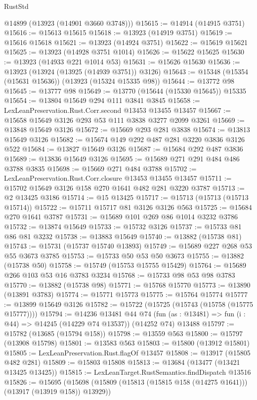 \begin{lexlean}{RustStd}
\begin{coremodule}
{\begin{coremodule}
{{{{{{{{{{{{{{{{{{{{{{{{{{{{{{{{{{{{{      @14899
      (@13923 (@14901 @3660 @3748)))
@15615 := @14914 (@14915 @3751)
@15616 := @15613 @15615
@15618 := @13923 (@14919 @3751)
@15619 := @15616 @15618
@15621 := @13923 (@14924 @3751)
@15622 := @15619 @15621
@15625 := @13923 (@14928 @3751 @1014)
@15626 := @15622 @15625
@15630 := @13923 (@14933 @221 @1014 @53)
@15631 := @15626 @15630
@15636 := @13923 (@13924 (@13925 (@14939 @3751)) @3126)
@15643 := @15348 (@15354 (@15631 @15636)) (@13923 (@15324 @15335 @98))
@15644 := @13772 @98
@15645 := @13777 @98
@15649 := @13770 (@15644 (@15330 @15645)) @15335
@15654 := @13804 @15649 @294 @111 @3841 @3845
@15658 := LexLeanPreservation.Rust.Corr.second @13453 @13455 @13457
@15667 := @15658 @15649 @3126 @293 @53 @111 @3838 @3277 @2099 @3261
@15669 := @13848 @15649 @3126
@15672 := @15669 @293 @281 @3838
@15674 := @13813 @15649 @3126
@15682 := @15674 @149 @292 @487 @281 @3220 @3836 @3126 @522
@15684 := @13827 @15649 @3126
@15687 := @15684 @292 @487 @3836
@15689 := @13836 @15649 @3126
@15695 := @15689 @271 @291 @484 @486 @3788 @3835
@15698 := @15669 @271 @484 @3788
@15702 := LexLeanPreservation.Rust.Corr.closure @13453 @13455 @13457
@15711 := @15702 @15649 @3126 @158 @270 @1641 @482 @281 @3220 @3787
@15713 := @2 @13425 @3186
@15714 := @15 @13425
@15717 := @15713 (@15713 (@15713 @15714))
@15722 := @15711 @15717 @81 @3126 @3126 @563
@15725 := @15684 @270 @1641 @3787
@15731 := @15689 @101 @269 @86 @1014 @3232 @3786
@15732 := @13874 @15649
@15733 := @15732 @3126
@15737 := @15733 @81 @86 @81 @3232
@15738 := @13883 @15649
@15740 := @13882 (@15738 @81)
@15743 := @15731 (@15737 @15740 @13893)
@15749 := @15689 @227 @268 @53 @55 @3673 @3785
@15753 := @15733 @50 @53 @50 @3673
@15755 := @13882 (@15738 @50)
@15758 := @15749 (@15753 @15755 @15429)
@15764 := @15689 @266 @103 @53 @16 @3783 @3234
@15768 := @15733 @98 @53 @98 @3783
@15770 := @13882 (@15738 @98)
@15771 := @15768 @15770
@15773 := @13890 (@13891 @3783)
@15774 := @15771 @15773
@15775 := @15764 @15774
@15777 := @13899 @15649 @3126
@15782 := @15722 (@15725 (@15743 (@15758 (@15775 @15777))))
@15794 := @14236
    @13481
    @44
    @74
    (fun (as : @13481) => fun (i : @44) => @14245 (@14229 @74 @13537))
    (@14252 @74)
    @13488
@15797 := @15782 (@13685 (@15794 @158))
@15798 := @13559 @563
@15800 := @15797 (@13908 @15798)
@15801 := @13583 @563
@15803 := @15800 (@13912 @15801)
@15805 := LexLeanPreservation.Rust.flagOf @13457
@15808 := @13917 (@15805 @482 @281)
@15809 := @15803 @15808
@15813 := @13684 (@13477 (@13421 @13425 @13425))
@15815 := LexLeanTarget.RustSemantics.findDispatch @13516
@15826 := @15695
    (@15698 (@15809 (@15813 (@15815 @158 (@14275 @1641))) (@13917 (@13919 @158)) @13929))
}}}}}}}}}}}}}}}}}}}}}}}}}}}}}}}}}}}}}
\end{coremodule}}
\end{coremodule}
\end{lexlean}

